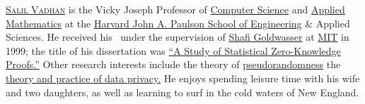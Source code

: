 \documentclass{toc}
\numberwithin{myalgctr}{section}
\theoremstyle{named}
\begin{document}
\begin{tocaboutauthors}
\begin{tocabout}[vadhan]
  \textsc{\href{http://salil.seas.harvard.edu}{Salil Vadhan}} is the Vicky Joseph Professor of \href{https://www.seas.harvard.edu/computer-science}{Computer Science} and \href{https://www.seas.harvard.edu/applied-mathematics}{Applied Mathematics} at the \href{http://www.seas.harvard.edu/}{Harvard John A. Paulson School of Engineering} \& Applied Sciences. He received his
  \phd\ under the supervision of \href{http://people.csail.mit.edu/shafi/}{Shafi Goldwasser} at \href{http://web.mit.edu/}{MIT} in 1999;
the title of his dissertation was  
\href{http://people.seas.harvard.edu/~salil/research/phdthesis-abs.html}{``A Study of Statistical Zero-Knowledge Proofs.''} Other research interests include the theory of \href{http://people.seas.harvard.edu/~salil/pseudorandomness/}{pseudorandomness} the \href{https://privacytools.seas.harvard.edu/}{theory and practice of data privacy.} He enjoys spending leisure time with his wife and two daughters, as well as learning to surf in the cold waters of New England.
\end{tocabout}


\end{tocaboutauthors}
\end{document}
